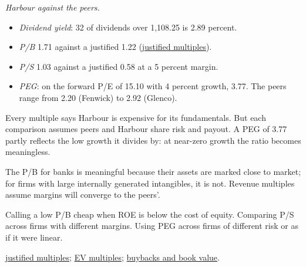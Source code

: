 \begin{qfmethod}
 \emph{Harbour against the peers.}
\begin{itemize}
\item \emph{Dividend yield}: 32 of dividends over 1,108.25 is 2.89 percent.
\item \emph{P/B} 1.71 against a justified 1.22 (\hyperref[meth:justified-multiples]{justified multiples}).
\item \emph{P/S} 1.03 against a justified 0.58 at a 5 percent margin.
\item \emph{PEG}: on the forward P/E of 15.10 with 4 percent growth, 3.77. The peers range from 2.20 (Fenwick) to 2.92 (Glenco).
\end{itemize}
Every multiple says Harbour is expensive for its fundamentals. But each comparison assumes peers and Harbour share risk and payout. A PEG of 3.77 partly reflects the low growth it divides by: at near-zero growth the ratio becomes meaningless.

 The P/B for banks is meaningful because their assets are marked close to market; for firms with large internally generated intangibles, it is not. Revenue multiples assume margins will converge to the peers'.

 Calling a low P/B cheap when ROE is below the cost of equity. Comparing P/S across firms with different margins. Using PEG across firms of different risk or as if it were linear.

 \hyperref[meth:justified-multiples]{justified multiples}; \hyperref[meth:enterprise-value-multiples]{EV multiples}; \hyperref[meth:distribution-effects]{buybacks and book value}.

\end{qfmethod}

